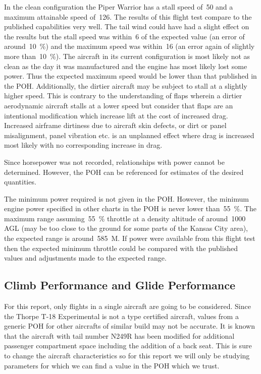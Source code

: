\documentclass[conf]{new-aiaa}
\begin{document}
In the clean configuration the Piper Warrior has a stall speed of~\SI{50}{\kts} and a maximum attainable speed of~\SI{126}{\kts}. The results of this flight test compare to the published capabilities very well. The tail wind could have had a slight effect on the results but the stall speed was within~\SI{6}{\kts} of the expected value (an error of around~\SI{10}{\percent}) and the maximum speed was within~\SI{16}{\kts} (an error again of slightly more than~\SI{10}{\percent}). The aircraft in its current configuration is most likely not as clean as the day it was manufactured and the engine has most likely lost some power. Thus the expected maximum speed would be lower than that published in the POH. Additionally, the dirtier aircraft may be subject to stall at a slightly higher speed. This is contrary to the understanding of flaps wherein a dirtier aerodynamic aircraft stalls at a lower speed but consider that flaps are an intentional modification which increase lift at the cost of increased drag. Increased airframe dirtiness due to aircraft skin defects, or dirt or panel misalignment, panel vibration etc. is an unplanned effect where drag is increased most likely with no corresponding increase in drag.

Since horsepower was not recorded, relationships with power cannot be determined. However, the POH can be referenced for estimates of the desired quantities.

The minimum power required is not given in the POH. However, the minimum engine power specified in other charts in the POH is never lower than~\SI{55}{\percent}. The maximum range assuming~\SI{55}{\percent} throttle at a density altitude of around~\SI{1000}{\foot} AGL (may be too close to the ground for some parts of the Kansas City area), the expected range is around~\SI{585}{\nauticalmile}. If power were available from this flight test then the expected minimum throttle could be compared with the published values and adjustments made to the expected range.

\FloatBarrier

\subsection{Climb Performance and Glide Performance}

For this report, only flights in a single aircraft are going to be considered. Since the Thorpe T-18 Experimental is not a type certified aircraft, values from a generic POH for other aircrafts of similar build may not be accurate. It is known that the aircraft with tail number N249R has been modified for additional passenger compartment space including the addition of a back seat. This is sure to change the aircraft characteristics so for this report we will only be studying parameters for which we can find a value in the POH which we trust.
\end{document}

